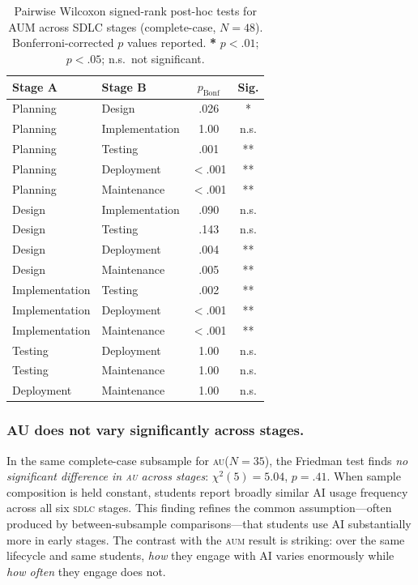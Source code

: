 \documentclass[sigconf,anonymous]{acmart}
\newcommand{\AUM}{\textsc{aum}\xspace}
\newcommand{\AU}{\textsc{au}\xspace}
\newcommand{\SDLC}{\textsc{sdlc}\xspace}
\begin{document}
\begin{table}[h]
\small
\caption{Pairwise Wilcoxon signed-rank post-hoc tests for AUM across
  SDLC stages (complete-case, $N = 48$). Bonferroni-corrected $p$
  values reported. {\bf **} $p<.01$; {\bf *} $p<.05$; n.s.~not
  significant.}
\label{tab:posthoc}
\begin{tabular}{llcc}
\toprule
\textbf{Stage A} & \textbf{Stage B} & $p_{\text{Bonf}}$ & \textbf{Sig.} \\
\midrule
Planning       & Design         & .026   & *    \\
Planning       & Implementation & 1.00   & n.s. \\
Planning       & Testing        & .001   & **   \\
Planning       & Deployment     & $<$.001 & ** \\
Planning       & Maintenance    & $<$.001 & ** \\
Design         & Implementation & .090   & n.s. \\
Design         & Testing        & .143   & n.s. \\
Design         & Deployment     & .004   & **   \\
Design         & Maintenance    & .005   & **   \\
Implementation & Testing        & .002   & **   \\
Implementation & Deployment     & $<$.001 & ** \\
Implementation & Maintenance    & $<$.001 & ** \\
Testing        & Deployment     & 1.00   & n.s. \\
Testing        & Maintenance    & 1.00   & n.s. \\
Deployment     & Maintenance    & 1.00   & n.s. \\
\bottomrule
\end{tabular}
\end{table}

\subsubsection{AU does not vary significantly across stages.}
In the same complete-case subsample for \AU ($N = 35$), the Friedman
test finds \emph{no significant difference in \AU across stages}:
$\chi^2(5) = 5.04$, $p = .41$. When sample composition is held
constant, students report broadly similar AI usage frequency across all
six \SDLC stages. This finding refines the common assumption---often
produced by between-subsample comparisons---that students use AI
substantially more in early stages. The contrast with the \AUM result
is striking: over the same lifecycle and same students, \emph{how}
they engage with AI varies enormously while \emph{how often} they
engage does not.
\end{document}
